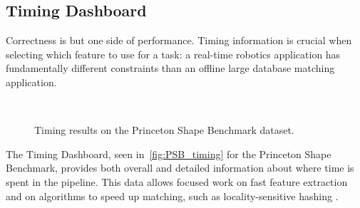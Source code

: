 \subsection{Timing Dashboard}

Correctness is but one side of performance.
Timing information is crucial when selecting which feature to use for a task: a real-time robotics application has fundamentally different constraints than an offline large database matching application.

\begin{figure}[thpb]
\centering
{}
 \\
\vspace{1em}
\caption{Timing results on the Princeton Shape Benchmark dataset.}
\label{fig:PSB_timing}
\end{figure}

The Timing Dashboard, seen in~\autoref{fig:PSB_timing} for the Princeton Shape Benchmark, provides both overall and detailed information about where time is spent in the pipeline.
This data allows focused work on fast feature extraction and on algorithms to speed up matching, such as locality-sensitive hashing \cite{Frome2004}.

